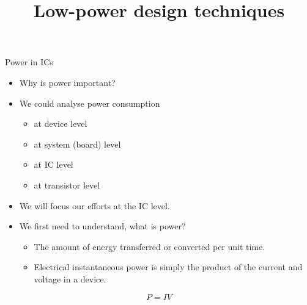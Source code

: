 \documentclass[]{slides}
\title{Low-power design techniques}
\begin{document}
\begin{frame} \titlepage \end{frame}


\begin{frame}{Power in ICs}{}
\begin{itemize}
\item Why is power important?
\pauseprint
\item We could analyse power consumption 
\begin{itemize}
\item at device level
\item at system (board) level
\item at \acf{IC} level
\item at transistor level
\end{itemize}
\pauseprint
\item We will focus our efforts at the \ac{IC} level.
\item We first need to understand, what is power?
\pauseprint
\begin{itemize}
\item The amount of energy transferred or converted per unit time.
\item Electrical instantaneous power is simply the product of the current and voltage in a device.

\end{itemize}
\end{itemize}
\begin{equation}
P = IV
\end{equation}
\end{frame}
\end{document}
